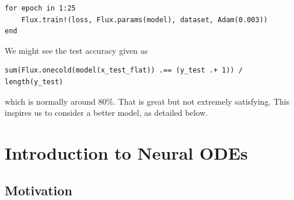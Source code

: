\documentclass[a4paper,11pt, titlepage]{article}
\theoremstyle{definition}
\theoremstyle{plain}
\theoremstyle{remark}
\begin{document}
\begin{verbatim}
for epoch in 1:25
    Flux.train!(loss, Flux.params(model), dataset, Adam(0.003))
end
\end{verbatim}

We might see the test accuracy given as

\begin{verbatim}
sum(Flux.onecold(model(x_test_flat)) .== (y_test .+ 1)) / length(y_test)
\end{verbatim}

which is normally around $80\%$. That is great but not extremely satisfying. This inspires us to consider a better model, as detailed below. 

\section{Introduction to Neural ODEs}

\subsection{Motivation}
\end{document}
